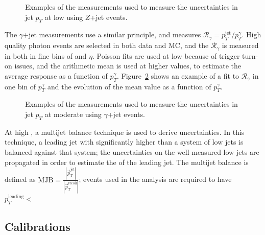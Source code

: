 
\begin{figure}
\centering
{}
\label{fig:jet-reconstruction:z_jet}
\caption{Examples of the measurements used to measure the uncertainties in jet $p_T$ at low \pt using $Z$+jet events.}
\end{figure}


The $\gamma$+jet measurements use a similar principle, and measures $\mathcal{R}_\gamma = p_T^\mathrm{jet} / p_T^\gamma$. High quality photon events are selected in both data and MC, and the $\mathcal{R}_\gamma$ is measured in both in fine bins of \pt and $\eta$. Poisson fits are used at low \pt because of trigger turn-on issues, and the arithmetic mean is used at higher values, to estimate the average response as a function of $p_T^\gamma$.  Figure~\ref{fig:jet-reconstruction:gamma_jet} shows an example of a fit to $\mathcal{R}_\gamma$ in one bin of $p_T^\gamma$ and the evolution of the mean value as a function of $p_T^\gamma$.


\begin{figure}
\centering
{}
\label{fig:jet-reconstruction:gamma_jet}
\caption{Examples of the measurements used to measure the uncertainties in jet $p_T$ at moderate \pt using $\gamma$+jet events.}
\end{figure}


At high \pt, a multijet balance technique is used to derive uncertainties. In this technique, a leading jet with \pt significantly higher than a system of low \pt jets is balanced against that system; the uncertainties on the well-measured low \pt jets are propagated in order to estimate the \pt of the leading jet. The multijet balance is defined as $\mathrm{MJB} = \frac{|\vec{p}_T^{\mathrm{jet}}|}{|\vec{p}_T^{\mathrm{recoil}}|} $; events used in the analysis are required to have $p_T^\mathrm{leading} < $


\subsection{\LargeR Calibrations}

